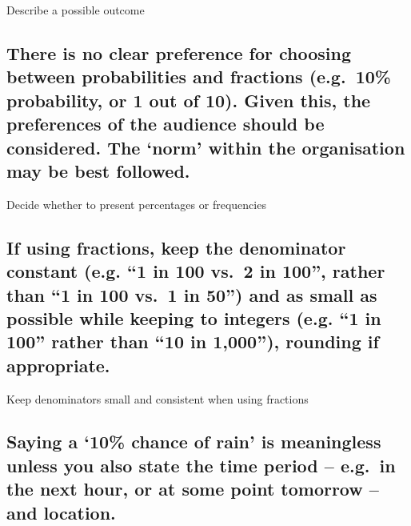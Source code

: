 \documentclass[]{book}
\begin{document}
 Describe a possible outcome

\subsection{\texorpdfstring{There is no clear preference for choosing
between probabilities and fractions (e.g.~10\% probability, or 1 out of
10). Given this, the preferences of the audience should be considered.
The `norm' within the organisation may be best
followed.}{There is no clear preference for choosing between probabilities and fractions (e.g.~10\% probability, or 1 out of 10). Given this, the preferences of the audience should be considered. The norm within the organisation may be best followed.}}\label{there-is-no-clear-preference-for-choosing-between-probabilities-and-fractions-e.g.10-probability-or-1-out-of-10.-given-this-the-preferences-of-the-audience-should-be-considered.-the-norm-within-the-organisation-may-be-best-followed.}

 Decide whether to present percentages or frequencies

\subsection{\texorpdfstring{If using fractions, keep the denominator
constant (e.g. ``1 in 100 vs.~2 in 100'', rather than ``1 in 100 vs.~1
in 50'') and as small as possible while keeping to integers (e.g. ``1 in
100'' rather than ``10 in 1,000''), rounding if
appropriate.}{If using fractions, keep the denominator constant (e.g. 1 in 100 vs.~2 in 100, rather than 1 in 100 vs.~1 in 50) and as small as possible while keeping to integers (e.g. 1 in 100 rather than 10 in 1,000), rounding if appropriate.}}\label{if-using-fractions-keep-the-denominator-constant-e.g.-1-in-100-vs.2-in-100-rather-than-1-in-100-vs.1-in-50-and-as-small-as-possible-while-keeping-to-integers-e.g.-1-in-100-rather-than-10-in-1000-rounding-if-appropriate.}

 Keep denominators small and consistent when using fractions

\subsection{\texorpdfstring{Saying a `10\% chance of rain' is
meaningless unless you also state the time period -- e.g.~in the next
hour, or at some point tomorrow -- and
location.}{Saying a 10\% chance of rain is meaningless unless you also state the time period -- e.g.~in the next hour, or at some point tomorrow -- and location.}}\label{saying-a-10-chance-of-rain-is-meaningless-unless-you-also-state-the-time-period-e.g.in-the-next-hour-or-at-some-point-tomorrow-and-location.}
\end{document}
